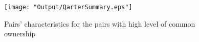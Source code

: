 \begin{LTR}
			
			\begin{figure}[htbp]
				\centering  
				\texttt{[image: "Output/QarterSummary.eps"]}
				\caption{Pairs' characteristics for the pairs with high level of common ownership}
				\label{QarterSummary}
			\end{figure}
			
		\end{LTR}
